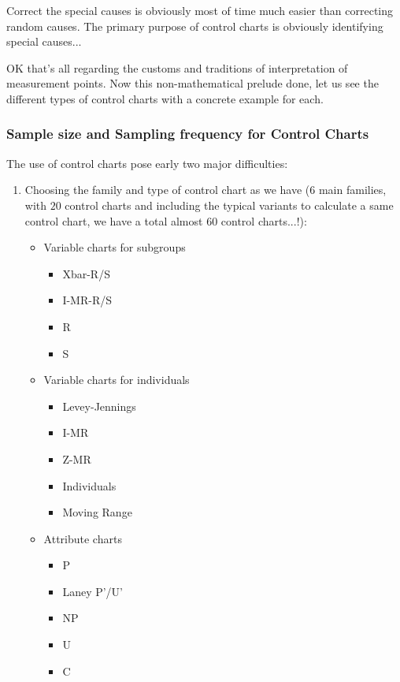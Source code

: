 	Correct the special causes is obviously most of time much easier than correcting random causes. The primary purpose of control charts is obviously identifying special causes...
	
	OK that's all regarding the customs and traditions of interpretation of measurement points. Now this non-mathematical prelude done, let us see the different types of control charts with a concrete example for each.
	
	\subsubsection{Sample size and Sampling frequency for Control Charts}
	The use of control charts pose early two major difficulties:
	\begin{enumerate}
		\item Choosing the family and type of control chart as we have ($6$ main families, with $20$ control charts and including the typical variants to calculate a same control chart, we have a total almost $60$ control charts...!):
		 \begin{itemize}
			\item Variable charts for subgroups
			\begin{itemize}
				\item Xbar-R/S
				\item I-MR-R/S
				\item R
				\item S
			\end{itemize}
			\item Variable charts for individuals
			\begin{itemize}
				\item Levey-Jennings
				\item I-MR
				\item Z-MR
				\item Individuals
				\item Moving Range
			\end{itemize}
	
			\item Attribute charts
			\begin{itemize}
				\item P
				\item Laney P'/U'
				\item NP
				\item U
				\item C
			\end{itemize}
	

\end{itemize}
\end{enumerate}
